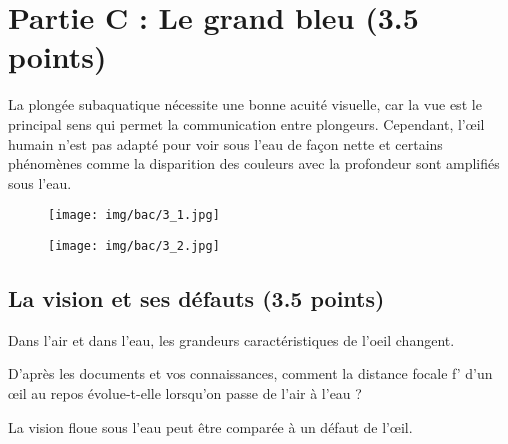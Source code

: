 \documentclass[answers]{exam}
\begin{document}
\section*{Partie C : Le grand bleu (3.5 points)}

La plongée subaquatique nécessite une bonne acuité visuelle, car la vue est le principal sens qui permet la communication entre plongeurs. Cependant, l'œil humain n'est pas adapté pour voir sous l'eau de façon nette et certains phénomènes comme la disparition des couleurs avec la profondeur sont amplifiés sous l'eau.

\begin{figure}[H]
  \centering
  \texttt{[image: img/bac/3\_1.jpg]}
\end{figure}

\begin{figure}[H]
  \centering
  \texttt{[image: img/bac/3\_2.jpg]}
\end{figure}

\subsection*{La vision et ses défauts (3.5 points)}

Dans l'air et dans l'eau, les grandeurs caractéristiques de l'oeil changent.

\begin{questions}
  \question[1] D'après les documents et vos connaissances, comment la distance focale f' d'un œil au repos évolue-t-elle lorsqu'on passe de l'air à l'eau ?
  
\question[1.5] La vision floue sous l'eau peut être comparée à un défaut de l'œil.
\end{questions}


\end{document}
